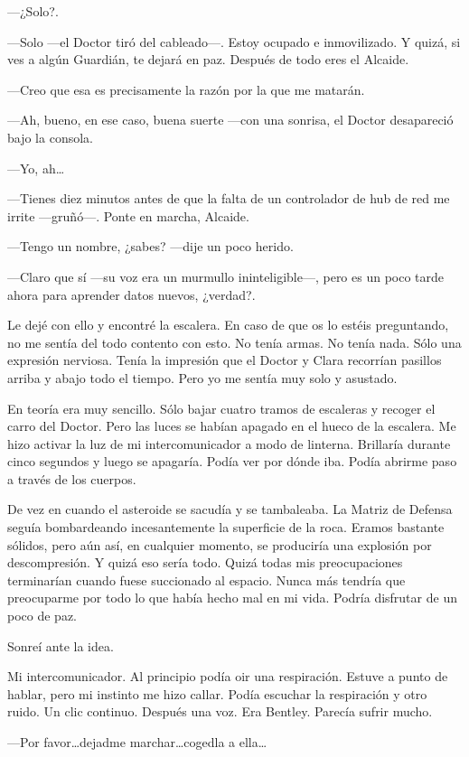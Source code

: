 ---¿Solo?.

---Solo ---el Doctor tiró del cableado---. Estoy ocupado e inmovilizado.
Y quizá, si ves a algún Guardián, te dejará en paz. Después de todo eres
el Alcaide.

---Creo que esa es precisamente la razón por la que me matarán.

---Ah, bueno, en ese caso, buena suerte ---con una sonrisa, el Doctor
desapareció bajo la consola.

---Yo, ah\ldots{}

---Tienes diez minutos antes de que la falta de un controlador de hub de
red me irrite ---gruñó---. Ponte en marcha, Alcaide.

---Tengo un nombre, ¿sabes? ---dije un poco herido.

---Claro que sí ---su voz era un murmullo ininteligible---, pero es un
poco tarde ahora para aprender datos nuevos, ¿verdad?.

Le dejé con ello y encontré la escalera. En caso de que os lo estéis
preguntando, no me sentía del todo contento con esto. No tenía armas. No
tenía nada. Sólo una expresión nerviosa. Tenía la impresión que el
Doctor y Clara recorrían pasillos arriba y abajo todo el tiempo. Pero yo
me sentía muy solo y asustado.

En teoría era muy sencillo. Sólo bajar cuatro tramos de escaleras y
recoger el carro del Doctor. Pero las luces se habían apagado en el
hueco de la escalera. Me hizo activar la luz de mi intercomunicador a
modo de linterna. Brillaría durante cinco segundos y luego se apagaría.
Podía ver por dónde iba. Podía abrirme paso a través de los cuerpos.

De vez en cuando el asteroide se sacudía y se tambaleaba. La Matriz de
Defensa seguía bombardeando incesantemente la superficie de la roca.
Eramos bastante sólidos, pero aún así, en cualquier momento, se
produciría una explosión por descompresión. Y quizá eso sería todo.
Quizá todas mis preocupaciones terminarían cuando fuese succionado al
espacio. Nunca más tendría que preocuparme por todo lo que había hecho
mal en mi vida. Podría disfrutar de un poco de paz.

Sonreí ante la idea.

Mi intercomunicador. Al principio podía oir una respiración. Estuve a
punto de hablar, pero mi instinto me hizo callar. Podía escuchar la
respiración y otro ruido. Un clic continuo. Después una voz. Era
Bentley. Parecía sufrir mucho.

---Por favor\ldots{}dejadme marchar\ldots{}cogedla a ella\ldots{}

